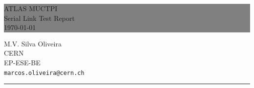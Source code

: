 \documentclass{report}
\begin{document}

\begin{titlepage} %
	
	
	\colorbox{grey}{
		\parbox[t]{0.93\textwidth}{ %
			\parbox[t]{0.91\textwidth}{ %
				\raggedleft %
				\fontsize{80pt}{40pt}\selectfont %
				\vspace{0.7cm} %

				ATLAS MUCTPI\\
				Serial Link Test Report\\
				\today\\
				
				\vspace{0.7cm} %
			}
		}
	}
	
	\vfill %
	
	
	\parbox[t]{0.93\textwidth}{ %
		\raggedleft %
		\large %
		{\Large M.V. Silva Oliveira}\\[4pt] %
		CERN\\
		EP-ESE-BE\\[4pt] %
		\texttt{marcos.oliveira@cern.ch}\\
		
		\hfill\rule{0.2\linewidth}{1pt}%
	}
	
\end{titlepage}

\tableofcontents
\newpage
\end{document}
